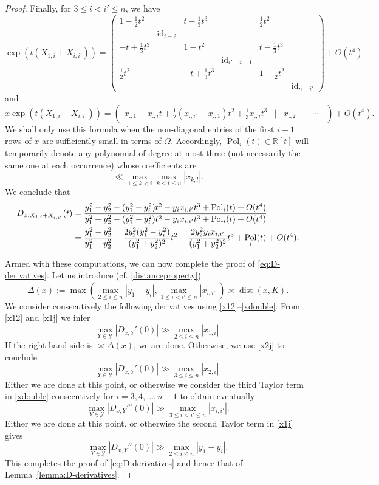 \documentclass[11pt,oneside]{amsart}
\numberwithin{equation}{section}
\theoremstyle{remark}
\theoremstyle{plain}
\DeclareMathOperator{\dist}{dist}
\DeclareMathOperator{\Pol}{Pol}
\newcommand\id{\mathrm{id}}
\newcommand\RR{\mathbb{R}}
\newcommand{\mcY}{\mathcal{Y}}
\renewcommand\leq{\leqslant}
\begin{document}
\begin{proof}
Finally, for $3 \leq i < i' \leq n$, we have
$$\exp(t (X_{1,i} + X_{i,i'})) = \left(\begin{matrix}1 - \frac{1}{2} t^2 & & t - \frac{1}{3} t^3& & \frac{1}{2} t^2\\ & \boxed{\id_{i-2}} & \\ - t + \frac{1}{3} t^3& & 1 - t^2 & & t - \frac{1}{3} t^3 \\ &&&\boxed{ \id_{i'-i-1} }\\ \frac{1}{2}t^2 & & - t + \frac{1}{3} t^3 & & 1 - \frac{1}{2}t^2 & \\ &&&&& \boxed{ \id_{n-i'} } \end{matrix}\right) + O(t^4)$$
and
$$x \exp(t (X_{1,i} + X_{i,i'})) = \left( \begin{matrix} x_{., 1} - x_{., i} t + \frac{1}{2} (x_{., i'} - x_{., 1})t^2 + \frac{1}{3} x_{., i}t^3 &|& x_{., 2} &|& \cdots \ \; \end{matrix}\right)+ O(t^4).$$
We shall only use this formula when the non-diagonal entries of the first $i-1$ rows of $x$ are sufficiently small in terms of $\Omega$. Accordingly, $\Pol_i(t)\in\RR[t]$ will temporarily denote any polynomial of degree at most three (not necessarily the same one at each occurrence) whose coefficients are
\[
\ll \max_{1\leq k<i} \max_{k<l\leq n} |x_{k,l}|.
\]
We conclude that
\begin{align}
\notag D_{x,X_{1,i} + X_{i,i'}}(t) &= 
\frac{y_1^2 - y_2^2 - (y_1^2 - y_i^2)t^2 - y_i x_{i,i'} t^3 + \Pol_i(t)+ O(t^4)}{y_1^2 + y_2^2 - (y_1^2 - y_i^2) t^2 - y_i x_{i,i'} t^3 + \Pol_i(t)+ O(t^4)}\\
\label{xdouble}& = \frac{y_1^2 - y_2^2}{y_1^2 + y_2^2} - \frac{2 y_2^2 (y_1^2- y_i^2)}{(y_1^2 + y_2^2)^2} t^2 - \frac{2 y_2^2 y_i x_{i, i'}}{(y_1^2 + y_2^2)^2} t^3 + \Pol_i(t) + O(t^4).
\end{align}

Armed with these computations, we can now complete the proof of \eqref{eq:D-derivatives}. Let us introduce (cf. \eqref{distanceproperty})
$$\Delta(x) := \max \left(\max_{2 \leq i \leq n} |y_1 - y_i|, \max_{1 \leq i < i' \leq n} |x_{i,i'}|\right) \asymp \dist(x, K).$$
We consider consecutively the following derivatives using \eqref{x12}--\eqref{xdouble}. 
From \eqref{x12} and \eqref{x1j} we infer
$$\max_{Y \in \mcY} \left| D_{x,Y}' (0) \right| \gg \max_{2 \leq i \leq n} |x_{1,i}|.$$
If the right-hand side is $\asymp \Delta(x)$, we are done. Otherwise, we use \eqref{x2j} to conclude
$$\max_{Y \in \mcY} \left| D_{x,Y}' (0) \right| \gg \max_{3 \leq i \leq n} |x_{2,i}|.$$
Either we are done at this point, or otherwise we consider the third Taylor term in \eqref{xdouble} consecutively for $i = 3, 4, \dotsc,n-1$ to obtain eventually
$$\max_{Y \in \mcY} \left| D_{x,Y}''' (0) \right| \gg \max_{3 \leq i < i' \leq n} |x_{i,i'}|.$$
Either we are done at this point, or otherwise the second Taylor term in \eqref{x1j} gives
$$\max_{Y \in \mcY} \left| D_{x,Y}'' (0) \right| \gg \max_{2 \leq i \leq n} |y_1 - y_i|.$$
This completes the proof of \eqref{eq:D-derivatives} and hence that of Lemma~\ref{lemma:D-derivatives}. 
\end{proof}
\end{document}
